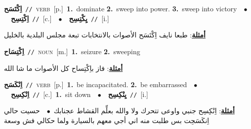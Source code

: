 \documentclass[10pt,a4paper,twoside]{article} %
\begin{document}
\begin{multicols}{2}
{\setlength\topsep{0pt}\textbf{\foreignlanguage{arabic}{اِكْتَسَح}}\ {\color{gray}\texttt{//}\color{black}}\ \textsc{verb}\ [p.]\ \textbf{1.}~dominate  \textbf{2.}~sweep into power.  \textbf{3.}~sweep into victory\ \ $\bullet$\ \ \setlength\topsep{0pt}\textbf{\foreignlanguage{arabic}{اِكْتِسِح}}\ {\color{gray}\texttt{//}\color{black}}\ [c.]\ \ $\bullet$\ \ \setlength\topsep{0pt}\textbf{\foreignlanguage{arabic}{يِكْتِسِح}}\ {\color{gray}\texttt{//}\color{black}}\ [i.]\  \begin{flushright}\color{gray}\foreignlanguage{arabic}{\textbf{\underline{\foreignlanguage{arabic}{أمثلة}}}: طبعا نايف اِكْتَسَح الأصوات بالانتخابات تبعة مجلس البلدية بالخليل}\end{flushright}\color{black}} \vspace{2mm}

{\setlength\topsep{0pt}\textbf{\foreignlanguage{arabic}{اِكْتِسَاح}}\ {\color{gray}\texttt{//}\color{black}}\ \textsc{noun}\ [m.]\ \textbf{1.}~seizure  \textbf{2.}~sweeping\  \begin{flushright}\color{gray}\foreignlanguage{arabic}{\textbf{\underline{\foreignlanguage{arabic}{أمثلة}}}: فاز باِكْتِساح كل الأصوات ما شا الله}\end{flushright}\color{black}} \vspace{2mm}

{\setlength\topsep{0pt}\textbf{\foreignlanguage{arabic}{اِنْكَسَح}}\ {\color{gray}\texttt{//}\color{black}}\ \textsc{verb}\ [p.]\ \textbf{1.}~be incapacitated.  \textbf{2.}~be embarrassed\ \ $\bullet$\ \ \setlength\topsep{0pt}\textbf{\foreignlanguage{arabic}{اِنْكِسِح}}\ {\color{gray}\texttt{//}\color{black}}\ [c.]\ \textbf{1.}~sit down\ \ $\bullet$\ \ \setlength\topsep{0pt}\textbf{\foreignlanguage{arabic}{يِنْكِسِح}}\ {\color{gray}\texttt{//}\color{black}}\ [i.]\  \begin{flushright}\color{gray}\foreignlanguage{arabic}{\textbf{\underline{\foreignlanguage{arabic}{أمثلة}}}: اِنْكِسِح جنبي واوعى تتحرك ولا والله بعلِّم القشاط عجنابك\ $\bullet$\ \  حسيت حالي اِنكَسَحِت بس طلبت منه اني أجي معهم بالسيارة ولما حكالي فش وسعة}\end{flushright}\color{black}} \vspace{2mm}


\end{multicols}
\end{document}
